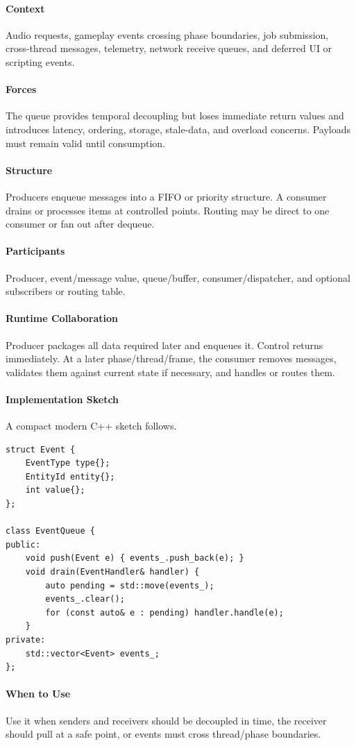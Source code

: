 \documentclass[11pt]{article}
\begin{document}
\paragraph{Context} Audio requests, gameplay events crossing phase boundaries, job submission, cross-thread messages, telemetry, network receive queues, and deferred UI or scripting events.
\paragraph{Forces} The queue provides temporal decoupling but loses immediate return values and introduces latency, ordering, storage, stale-data, and overload concerns. Payloads must remain valid until consumption.
\paragraph{Structure} Producers enqueue messages into a FIFO or priority structure. A consumer drains or processes items at controlled points. Routing may be direct to one consumer or fan out after dequeue.
\paragraph{Participants} Producer, event/message value, queue/buffer, consumer/dispatcher, and optional subscribers or routing table.
\paragraph{Runtime Collaboration} Producer packages all data required later and enqueues it. Control returns immediately. At a later phase/thread/frame, the consumer removes messages, validates them against current state if necessary, and handles or routes them.
\paragraph{Implementation Sketch} A compact modern C++ sketch follows.
\begin{lstlisting}
struct Event {
    EventType type{};
    EntityId entity{};
    int value{};
};

class EventQueue {
public:
    void push(Event e) { events_.push_back(e); }
    void drain(EventHandler& handler) {
        auto pending = std::move(events_);
        events_.clear();
        for (const auto& e : pending) handler.handle(e);
    }
private:
    std::vector<Event> events_;
};
\end{lstlisting}
\paragraph{When to Use} Use it when senders and receivers should be decoupled in time, the receiver should pull at a safe point, or events must cross thread/phase boundaries.
\end{document}
